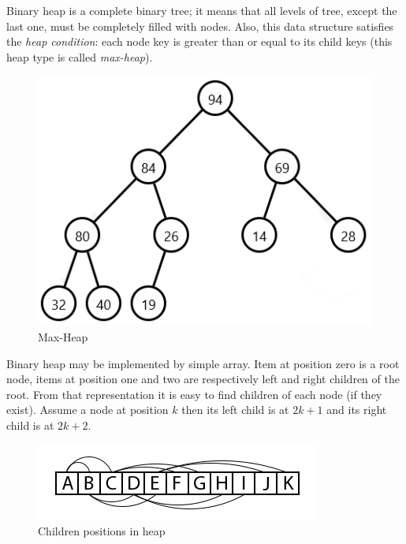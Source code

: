 \documentclass[
  field=inf,
  biblatex,
  language=english,
  glossaries,
  index
]{kidiplom}
\begin{document}
Binary heap is a complete binary tree; it means that all levels of tree, except the last one, must be completely filled with nodes. Also, this data structure satisfies the \textit{heap condition}: each node key is greater than or equal to its child keys (this heap type is called \textit{max-heap}).

\begin{figure}[H]
\begin{center}
	
	\includegraphics[scale=0.7]{img/Maxheap.png}
	\caption{Max-Heap}\label{fig:maxheap}
\end{center}
\end{figure}

Binary heap may be implemented by simple array. Item at position zero is a root node, items at position one and two are respectively left and right children of the root. From that representation it is easy to find children of each node (if they exist). Assume a node at position $k$ then its left child is at $2k + 1$ and its right child is at $2k + 2$.

\begin{figure}[H]
\begin{center}
	
	\includegraphics[scale=3]{img/Heapsort.png}
	\caption{Children positions in heap}\label{fig:heapsort}
\end{center}
\end{figure}
\end{document}
